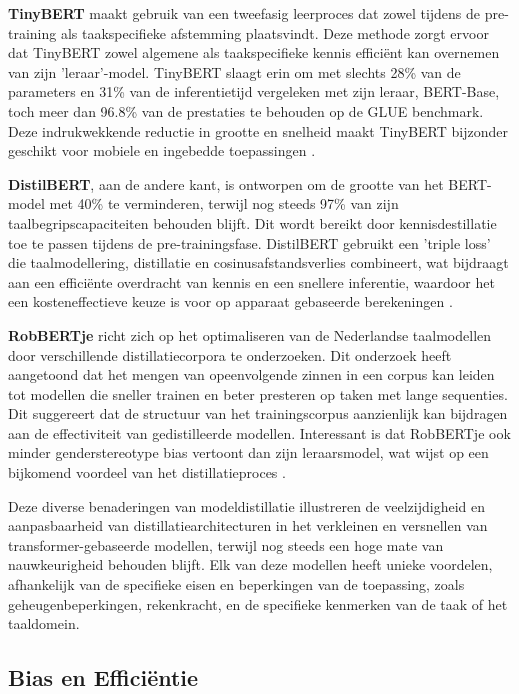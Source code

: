 \textbf{TinyBERT} maakt gebruik van een tweefasig leerproces dat zowel tijdens de pre-training als taakspecifieke afstemming plaatsvindt. Deze methode zorgt ervoor dat TinyBERT zowel algemene als taakspecifieke kennis efficiënt kan overnemen van zijn 'leraar'-model. TinyBERT slaagt erin om met slechts 28\% van de parameters en 31\% van de inferentietijd vergeleken met zijn leraar, BERT-Base, toch meer dan 96.8\% van de prestaties te behouden op de GLUE benchmark. Deze indrukwekkende reductie in grootte en snelheid maakt TinyBERT bijzonder geschikt voor mobiele en ingebedde toepassingen \autocite{Jiao2019TinyBERT}.

\textbf{DistilBERT}, aan de andere kant, is ontworpen om de grootte van het BERT-model met 40\% te verminderen, terwijl nog steeds 97\% van zijn taalbegripscapaciteiten behouden blijft. Dit wordt bereikt door kennisdestillatie toe te passen tijdens de pre-trainingsfase. DistilBERT gebruikt een 'triple loss' die taalmodellering, distillatie en cosinusafstandsverlies combineert, wat bijdraagt aan een efficiënte overdracht van kennis en een snellere inferentie, waardoor het een kosteneffectieve keuze is voor op apparaat gebaseerde berekeningen \autocite{Sanh2019DistilBERT}.

\textbf{RobBERTje} richt zich op het optimaliseren van de Nederlandse taalmodellen door verschillende distillatiecorpora te onderzoeken. Dit onderzoek heeft aangetoond dat het mengen van opeenvolgende zinnen in een corpus kan leiden tot modellen die sneller trainen en beter presteren op taken met lange sequenties. Dit suggereert dat de structuur van het trainingscorpus aanzienlijk kan bijdragen aan de effectiviteit van gedistilleerde modellen. Interessant is dat RobBERTje ook minder genderstereotype bias vertoont dan zijn leraarsmodel, wat wijst op een bijkomend voordeel van het distillatieproces \autocite{Delobelle2021}.

Deze diverse benaderingen van modeldistillatie illustreren de veelzijdigheid en aanpasbaarheid van distillatiearchitecturen in het verkleinen en versnellen van trans\-for\-mer-gebaseerde modellen, terwijl nog steeds een hoge mate van nauwkeurigheid behouden blijft. Elk van deze modellen heeft unieke voordelen, afhankelijk van de specifieke eisen en beperkingen van de toepassing, zoals geheugenbeperkingen, rekenkracht, en de specifieke kenmerken van de taak of het taaldomein.


\subsection{Bias en Efficiëntie}

